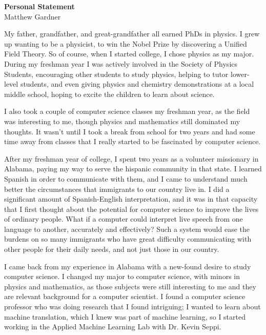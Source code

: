 \documentclass[onecolumn, 12pt]{article}
\begin{document}
\pagestyle{empty}

\begin{center}
  \textbf{Personal Statement}\\
  Matthew Gardner
\end{center}

My father, grandfather, and great-grandfather all earned PhDs in physics.  I
grew up wanting to be a physicist, to win the Nobel Prize by discovering a
Unified Field Theory.  So of course, when I started college, I chose physics as
my major.  During my freshman year I was actively involved in the Society of
Physics Students, encouraging other students to study physics, helping to tutor
lower-level students, and even giving physics and chemistry demonstrations at a
local middle school, hoping to excite the children to learn about science.

I also took a couple of computer science classes my freshman year, as the field
was interesting to me, though physics and mathematics still dominated my
thoughts.  It wasn't until I took a break from school for two years and had
some time away from classes that I really started to be fascinated by computer
science.

After my freshman year of college, I spent two years as a volunteer missionary
in Alabama, paying my way to serve the hispanic community in that state.  I
learned Spanish in order to communicate with them, and I came to understand
much better the circumstances that immigrants to our country live in.  I did a
significant amount of Spanish-English interpretation, and it was in that
capacity that I first thought about the potential for computer science to
improve the lives of ordinary people.  What if a computer could interpret live
speech from one language to another, accurately and effectively?  Such a system
would ease the burdens on so many immigrants who have great difficulty
communicating with other people for their daily needs, and not just those in
our country.

I came back from my experience in Alabama with a new-found desire to study
computer science.  I changed my major to computer science, with minors in
physics and mathematics, as those subjects were still interesting to me and
they are relevant background for a computer scientist.  I found a computer
science professor who was doing research that I found intriguing; I wanted to
learn about machine translation, which I knew was part of machine learning, so
I started working in the Applied Machine Learning Lab with Dr. Kevin Seppi.
\end{document}
